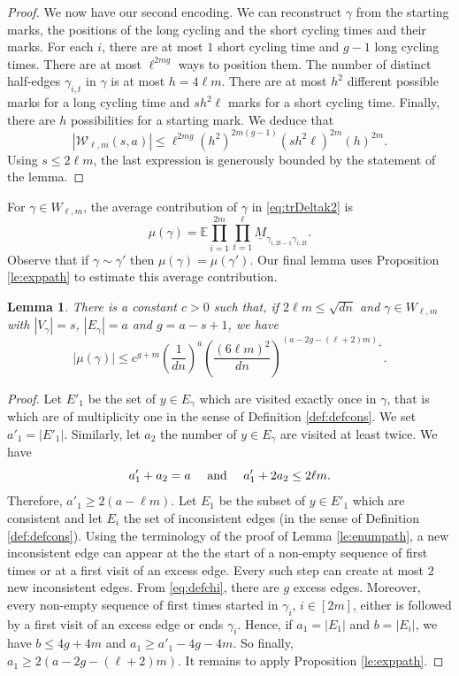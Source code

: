 \documentclass[11pt]{article}
\newtheorem{lemma}{Lemma}
\newcommand{\dE}{\mathbb {E}}
\newcommand{\cE}{E}
\newcommand{\cW}{\mathcal {W}}
\newcommand{\ABS}[1]{{{\left| #1 \right|}}} %
\newcommand{\PAR}[1]{{{\left(#1\right)}}} %
\newcommand{\1}{1\!\!{\sf I}}\newcommand{\IND}{\1}
\begin{document}
\begin{proof}
We now have our second encoding. We can reconstruct $\gamma$ from the starting marks, the positions of the long cycling  and the short cycling times and their marks. For each $i$, there are at most $1$ short cycling time and $g-1$ long cycling times. There are at most $  \ell ^{2m g}$ ways to position them.  The number of distinct half-edges $\gamma_{i,t}$ in $\gamma$ is at most $h = 4 \ell m$. There are at most $h ^2$ different possible marks for a long cycling time and $ s h ^2 \ell$ marks for a short cycling time. Finally, there are $h$ possibilities for a starting mark. We deduce that    
$$
| \cW _{\ell,m} (s,a) | \leq    \ell ^{2 m g} ( h^2 ) ^{2m (g-1)} (s h^2 \ell )^{2m}   (h) ^{2m}. 
$$
Using $s \leq 2\ell m$, the last expression is generously bounded by the statement of the lemma. \end{proof}


For $\gamma \in W_{\ell,m}$, the average contribution of $\gamma$ in \eqref{eq:trDeltak2} is
\begin{equation}\label{eq:defmug}
\mu(\gamma) =   \dE \prod_{i=1}^{2m}  \prod_{t=1}^{\ell} \underline M_{\gamma_{i,2t-1}  \gamma_{i,2t}}.
\end{equation}
Observe that if $\gamma \sim \gamma'$ then $\mu(\gamma) = \mu(\gamma')$. Our final lemma uses  Proposition \ref{le:exppath} to estimate this average contribution. 

\begin{lemma}\label{le:meanpath}
There is a constant $c > 0$ such that, if $2 \ell m \leq \sqrt{ d n}$ and $\gamma \in W_{\ell,m} $ with $|V_\gamma| = s$, $|\cE_\gamma |= a$ and $g = a - s+1$, we have
$$
\ABS{ \mu(\gamma)} \leq  c^{g + m}  \PAR{\frac{ 1 }{dn} }^a   \PAR{\frac{ (6\ell m)^2 }{dn} } ^{  (a - 2g - (\ell+2) m)_+}.  
$$
\end{lemma}
\begin{proof}
Let $\cE'_1$ be the set of $y \in \cE_\gamma$ which are visited exactly once in $\gamma$, that is which are of multiplicity one in the sense of Definition \ref{def:defcons}.
We set $a'_1 =| \cE'_1 |$. Similarly, let $a_2$ the number of $y \in \cE_\gamma$ are visited at least twice.  We have 
$$
a'_1 + a_2 = a \quad  \hbox{ and } \quad a'_1 + 2 a_2 \leq 2\ell m. 
$$ 
Therefore, $a'_1 \geq 2( a - \ell m)$. Let  $\cE_1 $ be the subset of $ y \in \cE'_1 $ which are consistent and let $\cE_i $ the set of inconsistent edges (in the sense of Definition \ref{def:defcons}).  Using the terminology of the proof of Lemma \ref{le:enumpath}, a new inconsistent edge can appear at the the start of a non-empty sequence of first times or at a first visit of an excess edge. Every such step can create at most $2$ new inconsistent edges. From  \eqref{eq:defchi}, there are $g$ excess edges. Moreover, every non-empty sequence of
first times started in $\gamma_i$, $i \in [2m]$, either is followed by a first visit of an excess edge or ends $\gamma_i$. Hence, if $a_1 = |\cE_1|$ and $b = |\cE_i |$, we have $b \leq 4 g + 4m $ and
$ a_1 \geq a'_1 - 4 g - 4m$. So finally, $a_1 \geq 2 ( a  - 2 g   - (\ell+2)m)$. It remains to apply  Proposition \ref{le:exppath}. 
\end{proof}
\end{document}
